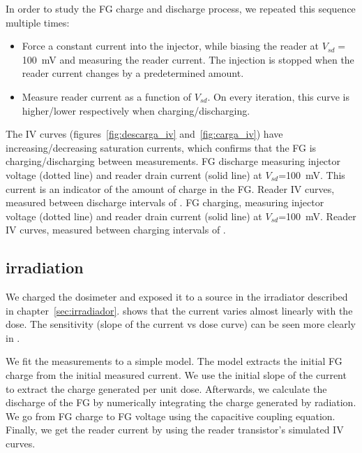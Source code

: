 In order to study the FG charge and discharge process,
we repeated this sequence multiple times:
\begin{itemize}
    \item Force a constant current into the injector,
        while biasing the reader at $V_{sd}=$\SI{100}{\milli\volt}
        and measuring the reader current.
        The injection is stopped when the reader current changes by a predetermined amount.
    \item Measure reader current as a function of $V_{sd}$.
        On every iteration, this curve is higher/lower respectively when charging/discharging.
\end{itemize}

The IV curves (figures~\ref{fig:descarga_iv}
and~\ref{fig:carga_iv}) have increasing/decreasing saturation currents,
which confirms that the FG is charging/discharging
between measurements.
{FG discharge measuring injector voltage (dotted line) and
reader drain current (solid line) at
$V_{sd}$=\SI{100}{\milli\volt}.
This current is an indicator of the amount of charge in the FG.}
{Reader IV curves, measured between discharge intervals of
    .}
{FG charging, measuring injector voltage (dotted line) and
reader drain current (solid line) at
$V_{sd}$=\SI{100}{\milli\volt}.}
{Reader IV curves, measured between charging intervals of
    .}
\subsection{\Strontium irradiation}
We charged the dosimeter and exposed it to a 
\Strontium source
in the irradiator described in chapter~\ref{sec:irradiador}.
 shows that the current
varies almost linearly with the dose.
The sensitivity (slope of the current vs dose curve)
can be seen more clearly in
.

We fit the measurements to a simple model.
The model extracts the initial FG charge from the initial measured current.
We use the initial slope of the current to extract the charge generated per unit dose.
Afterwards, we calculate the discharge of the FG by numerically integrating the charge generated by radiation.
We go from FG charge to FG voltage using the capacitive coupling equation.
Finally, we get the reader current by using the reader transistor's simulated IV curves.

